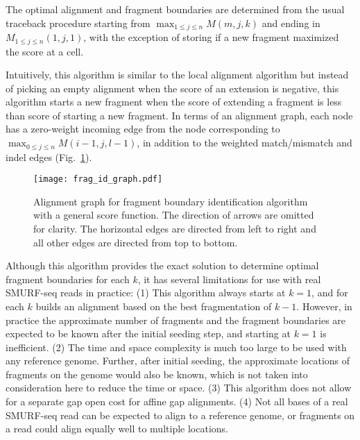 The optimal alignment and fragment boundaries are determined from the
usual traceback procedure starting from $\max_{1 \leq j \leq n}M(m,j,k)$
and ending in $M_{1 \leq j \leq n}(1,j,1)$, with the exception of
storing if a new fragment maximized the score at a cell.

Intuitively, this algorithm is similar to the local alignment algorithm
but instead of picking an empty alignment when the score of an extension
is negative, this algorithm starts a new fragment when the score of
extending a fragment is less than score of starting a new fragment. In
terms of an alignment graph, each node has a zero-weight incoming edge
from the node corresponding to $\max_{0 \leq j \leq n}M(i-1,j,l-1)$, in
addition to the weighted match/mismatch and indel edges
(Fig.~\ref{frag_alg}).

\begin{figure}[h!]
\centering
\texttt{[image: frag\_id\_graph.pdf]}
\caption[Alignment graph for fragment boundary identification algorithm
  with a general score function]{
  Alignment graph for fragment boundary identification algorithm
  with a general score function. The direction of arrows are omitted
  for clarity. The horizontal edges are directed from left to right and
  all other edges are directed from top to bottom.}
\label{frag_alg}
\end{figure}

Although this algorithm provides the exact solution to determine optimal
fragment boundaries for each $k$, it has several limitations for use
with real SMURF-seq reads in practice:
(1) This algorithm always starts at $k=1$, and for each $k$ builds an
alignment based on the best fragmentation of $k-1$.
However, in practice the approximate number of fragments and the
fragment boundaries are expected to be known after the initial seeding
step, and starting at $k=1$ is inefficient.
(2) The time and space complexity is much too large to be used with any
reference genome. Further, after initial seeding, the approximate
locations of fragments on the genome would also be known, which is not
taken into consideration here to reduce the time or space.
(3) This algorithm does not allow for a separate gap open cost for
affine gap alignments.
(4) Not all bases of a real SMURF-seq read can be expected to align to a
reference genome, or fragments on a read could align equally well to
multiple locations.

